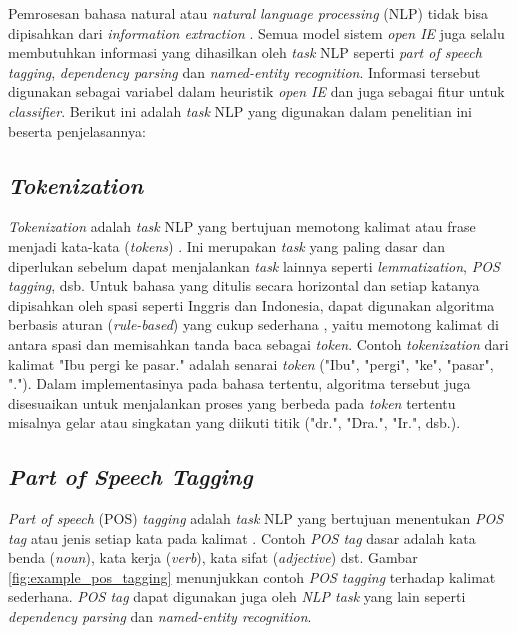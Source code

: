 Pemrosesan bahasa natural atau \textit{natural language processing} (NLP) tidak bisa dipisahkan dari \textit{information extraction} \citep{banko2007open,fader2011identifying,etzioni2011open,angeli2015leveraging}. Semua model sistem \textit{open IE} juga selalu membutuhkan informasi yang dihasilkan oleh \textit{task} NLP seperti \textit{part of speech tagging}, \textit{dependency parsing} dan \textit{named-entity recognition}. Informasi tersebut digunakan sebagai variabel dalam heuristik \textit{open IE} dan juga sebagai fitur untuk \textit{classifier}. Berikut ini adalah \textit{task} NLP yang digunakan dalam penelitian ini beserta penjelasannya:

\subsection{\textit{Tokenization}}

\textit{Tokenization} adalah \textit{task} NLP yang bertujuan memotong kalimat atau frase menjadi kata-kata (\textit{tokens}) \citep{manning2008introduction}. Ini merupakan \textit{task} yang paling dasar dan diperlukan sebelum dapat menjalankan \textit{task} lainnya seperti \textit{lemmatization}, \textit{POS tagging}, dsb. Untuk bahasa yang ditulis secara horizontal dan setiap katanya dipisahkan oleh spasi seperti Inggris dan Indonesia, dapat digunakan algoritma berbasis aturan (\textit{rule-based}) yang cukup sederhana \citep{manningptbtokenizer}, yaitu memotong kalimat di antara spasi dan memisahkan tanda baca sebagai \textit{token}. Contoh \textit{tokenization} dari kalimat "Ibu pergi ke pasar." adalah senarai \textit{token} ("Ibu", "pergi", "ke", "pasar", "."). Dalam implementasinya pada bahasa tertentu, algoritma tersebut juga disesuaikan untuk menjalankan proses yang berbeda pada \textit{token} tertentu misalnya gelar atau singkatan yang diikuti titik ("dr.", "Dra.", "Ir.", dsb.).

\subsection{\textit{Part of Speech Tagging}}

\textit{Part of speech} (POS) \textit{tagging} adalah \textit{task} NLP yang bertujuan menentukan \textit{POS tag} atau jenis setiap kata pada kalimat \citep{jurafsky2000speech}. Contoh \textit{POS tag} dasar adalah kata benda (\textit{noun}), kata kerja (\textit{verb}), kata sifat (\textit{adjective}) dst. Gambar \ref{fig:example_pos_tagging} menunjukkan contoh \textit{POS tagging} terhadap kalimat sederhana. \textit{POS tag} dapat digunakan juga oleh \textit{NLP task} yang lain seperti \textit{dependency parsing} dan \textit{named-entity recognition}.

